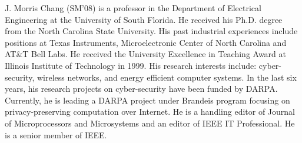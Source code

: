 \documentclass[journal]{IEEEtai}
\begin{document}
\begin{IEEEbiography}{J. Morris Chang}
	(SM'08) is a professor in the Department of Electrical Engineering at the University of South Florida. He received his Ph.D. degree from the North Carolina State University. His past industrial experiences include positions at Texas Instruments, Microelectronic Center of North Carolina and AT\&T Bell Labs. He received the University Excellence in Teaching Award at Illinois Institute of Technology in 1999. His research interests include: cyber-security, wireless networks, and energy efficient computer systems. In the last six years, his research projects on cyber-security have been funded by DARPA. Currently, he is leading a DARPA project under Brandeis program focusing on privacy-preserving computation over Internet. He is a handling editor of Journal of Microprocessors and Microsystems and an editor of IEEE IT Professional. He is a senior member of IEEE.
\end{IEEEbiography}




\newpage

\end{document}
